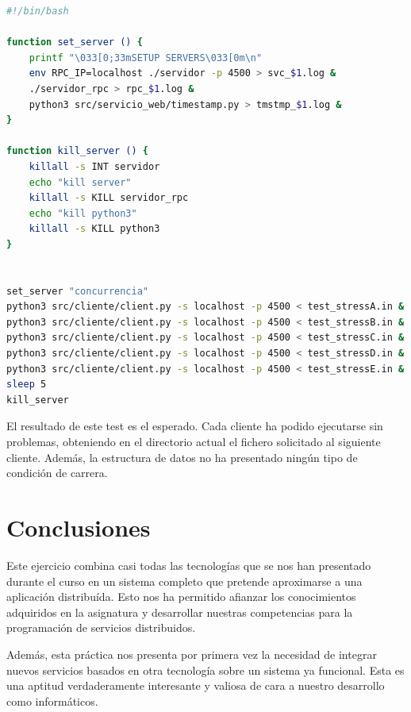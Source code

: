 \documentclass[]{article}
\begin{document}
\begin{lstlisting}[caption=Script para la ejecucion concurrente de 5 clientes, language=bash]
#!/bin/bash

function set_server () {
    printf "\033[0;33mSETUP SERVERS\033[0m\n"
    env RPC_IP=localhost ./servidor -p 4500 > svc_$1.log &
    ./servidor_rpc > rpc_$1.log &
    python3 src/servicio_web/timestamp.py > tmstmp_$1.log &
}

function kill_server () {
    killall -s INT servidor
    echo "kill server"
    killall -s KILL servidor_rpc
    echo "kill python3"
    killall -s KILL python3
}


set_server "concurrencia"
python3 src/cliente/client.py -s localhost -p 4500 < test_stressA.in &
python3 src/cliente/client.py -s localhost -p 4500 < test_stressB.in &
python3 src/cliente/client.py -s localhost -p 4500 < test_stressC.in &
python3 src/cliente/client.py -s localhost -p 4500 < test_stressD.in &
python3 src/cliente/client.py -s localhost -p 4500 < test_stressE.in &
sleep 5
kill_server

\end{lstlisting}

El resultado de este test es el esperado. Cada cliente ha podido ejecutarse sin problemas, obteniendo en el directorio actual el fichero solicitado al siguiente cliente. Además, la estructura de datos no ha presentado ningún tipo de condición de carrera. 

\section{Conclusiones}
\label{sec:conclusiones}
Este ejercicio combina casi todas las tecnologías que se nos han presentado durante el curso en un sistema completo que pretende aproximarse a una aplicación distribuída. Esto nos ha permitido afianzar los conocimientos adquiridos en la asignatura y desarrollar nuestras competencias para la programación de servicios distribuidos. 

Además, esta práctica nos presenta por primera vez la necesidad de integrar nuevos servicios basados en otra tecnología sobre un sistema ya funcional. Esta es una aptitud verdaderamente interesante y valiosa de cara a nuestro desarrollo como informáticos.
\end{document}
